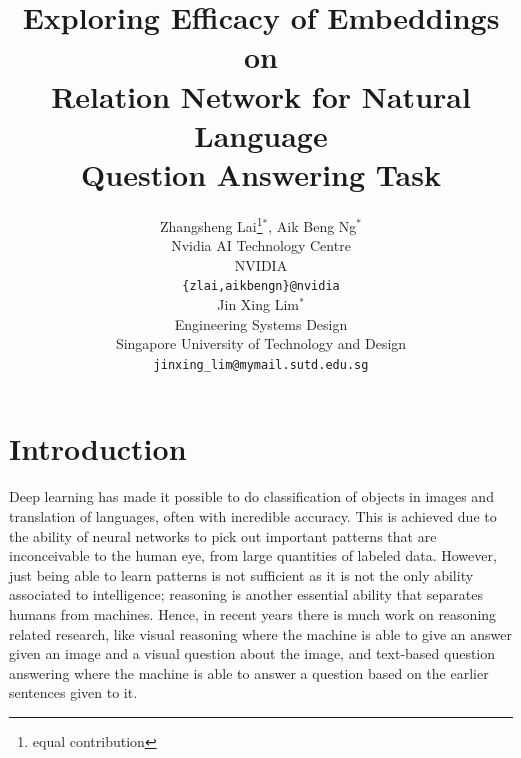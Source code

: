 \documentclass{article}
\title{Exploring Efficacy of Embeddings on \\ Relation Network for Natural Language \\ Question Answering Task}
\author{
Zhangsheng Lai\footnote{equal contribution}$^\ast$, Aik Beng Ng$^\ast$ \\
Nvidia AI Technology Centre\\
NVIDIA\\
  \texttt{\{zlai,aikbengn\}@nvidia} \\
\And
Jin Xing Lim$^\ast$ \\
Engineering Systems Design\\
  Singapore University of Technology and Design\\
  \texttt{jinxing\_lim@mymail.sutd.edu.sg} \\  %
}
\begin{document}

\maketitle



\section{Introduction}
%

	Deep learning has made it possible to do classification of objects in images and translation of languages, often with incredible accuracy. This is achieved due to the ability of neural networks to pick out important patterns that are inconceivable to the human eye, from large quantities of labeled data. However, just being able to learn patterns is not sufficient as it is not the only ability associated to intelligence; reasoning is another essential ability \cite{Bottou2011} that separates humans from machines. Hence, in recent years there is much work on reasoning related research, like visual reasoning \cite{Johnson2017, Santoro2017} where the machine is able to give an answer given an image and a visual question about the image, and text-based question answering \cite{Santoro2017} where the machine is able to answer a question based on the earlier sentences given to it. 
\end{document}
